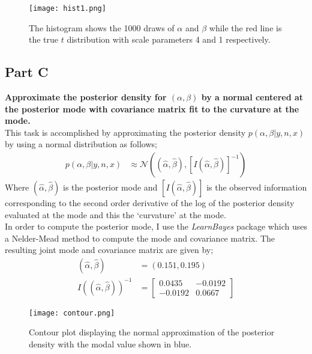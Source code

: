 \documentclass{article}
\begin{document}
 \begin{figure}[H]
\centering
\texttt{[image: hist1.png]}
\caption{The histogram shows the 1000 draws of $\alpha$ and $\beta$ while the red line is the true $t$ distribution with scale parameters 4 and 1 respectively.}
\label{deltat}
\end{figure}

\subsection{Part C}
\textbf{Approximate the posterior density for $(\alpha,\beta)$ by a normal centered at the posterior mode with covariance matrix fit to the curvature at the mode.}\\
This task is accomplished by approximating the posterior density $p(\alpha,\beta | y, n, x)$ by using a normal distribution as follows;
\begin{align*}
p(\alpha,\beta | y, n, x) &\approx \mathcal{N}((\hat{\alpha}, \hat{\beta}), [I(\hat{\alpha}, \hat{\beta})]^{-1})
\end{align*}
Where $(\hat{\alpha}, \hat{\beta})$ is the posterior mode and $[I(\hat{\alpha}, \hat{\beta})]$ is the observed information corresponding to the second order derivative of the log of the posterior density evaluated at the mode and this the `curvature' at the mode.\\
In order to compute the posterior mode, I use the \textit{LearnBayes} package which uses a Nelder-Mead method to compute the mode and covariance matrix. The resulting joint mode and covariance matrix are given by;
\begin{align*}
\displaystyle
(\hat{\alpha}, \hat{\beta})  & = (0.151, 0.195) \\
I((\hat{\alpha}, \hat{\beta}))^{-1} & = \begin{bmatrix}
  				   0.0435 & -0.0192 \\
				 -0.0192 & 0.0667
  					\end{bmatrix}
\end{align*}

 \begin{figure}[H]
\centering
\texttt{[image: contour.png]}
\caption{Contour plot displaying the normal approximation of the posterior density with the modal value shown in blue.}
\label{deltat}
\end{figure}
\end{document}
